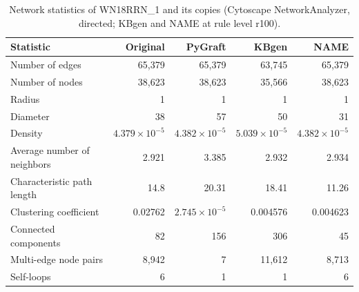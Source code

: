 \begin{table}[t]
\centering
\caption{Network statistics of WN18RRN\_1 and its copies (Cytoscape NetworkAnalyzer, directed; KBgen and NAME at rule level r100).}
\label{tab:cytoscape_WN18RRN_1}
\begin{tabular}{lrrrr}
\toprule
Statistic & Original & PyGraft & KBgen & NAME \\
\midrule
Number of edges & 65{,}379 & 65{,}379 & 63{,}745 & 65{,}379 \\
Number of nodes & 38{,}623 & 38{,}623 & 35{,}566 & 38{,}623 \\
Radius & 1 & 1 & 1 & 1 \\
Diameter & 38 & 57 & 50 & 31 \\
Density & $4.379\times10^{-5}$ & $4.382\times10^{-5}$ & $5.039\times10^{-5}$ & $4.382\times10^{-5}$ \\
Average number of neighbors & 2.921 & 3.385 & 2.932 & 2.934 \\
Characteristic path length & 14.8 & 20.31 & 18.41 & 11.26 \\
Clustering coefficient & 0.02762 & $2.745\times10^{-5}$ & 0.004576 & 0.004623 \\
Connected components & 82 & 156 & 306 & 45 \\
Multi-edge node pairs & 8{,}942 & 7 & 11{,}612 & 8{,}713 \\
Self-loops & 6 & 1 & 1 & 6 \\
\bottomrule
\end{tabular}
\end{table}
